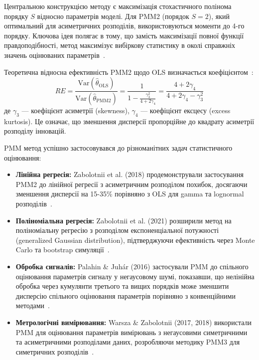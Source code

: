 \documentclass[12pt,a4paper]{article}
\begin{document}
Центральною конструкцією методу є максимізація стохастичного полінома порядку $S$ відносно параметрів моделі. Для PMM2 (порядок $S=2$), який оптимальний для асиметричних розподілів, використовуються моменти до 4-го порядку. Ключова ідея полягає в тому, що замість максимізації повної функції правдоподібності, метод максимізує вибіркову статистику в околі справжніх значень оцінюваних параметрів~\cite{kunchenko2002polynomial,kunchenko2006stochastic}.

Теоретична відносна ефективність PMM2 щодо OLS визначається коефіцієнтом~\cite{zabolotnii2018polynomial}:
\begin{equation}
\label{eq:relative_efficiency}
RE = \frac{\text{Var}(\hat{\theta}_{\text{OLS}})}{\text{Var}(\hat{\theta}_{\text{PMM2}})} = \frac{1}{1 - \frac{\gamma_3^2}{4+2\gamma_4}} = \frac{4 + 2\gamma_4}{4 + 2\gamma_4 - \gamma_3^2}
\end{equation}
де $\gamma_3$ --- коефіцієнт асиметрії (skewness), $\gamma_4$ --- коефіцієнт ексцесу (excess kurtosis). Це означає, що зменшення дисперсії пропорційне до квадрату асиметрії розподілу інновацій.

PMM метод успішно застосовувався до різноманітних задач статистичного оцінювання:

\begin{itemize}
    \item \textbf{Лінійна регресія:} Zabolotnii et al. (2018) продемонстрували застосування PMM2 до лінійної регресії з асиметричним розподілом похибок, досягаючи зменшення дисперсії на 15-35\% порівняно з OLS для gamma та lognormal розподілів~\cite{zabolotnii2018polynomial}.

    \item \textbf{Поліноміальна регресія:} Zabolotnii et al. (2021) розширили метод на поліноміальну регресію з розподілом експоненціальної потужності (generalized Gaussian distribution), підтверджуючи ефективність через Monte Carlo та bootstrap симуляції~\cite{zabolotnii2021estimating}.

    \item \textbf{Обробка сигналів:} Palahin \& Juhár (2016) застосували PMM до спільного оцінювання параметрів сигналу у негаусовому шумі, показавши, що нелінійна обробка через кумулянти третього та вищих порядків може зменшити дисперсію спільного оцінювання параметрів порівняно з конвенційними методами~\cite{palahin2016joint}.

    \item \textbf{Метрологічні вимірювання:} Warsza \& Zabolotnii (2017, 2018) використали PMM для оцінювання параметрів вимірювань з негаусовими симетричними та асиметричними розподілами даних, розробляючи методику PMM3 для симетричних розподілів~\cite{warsza2017polynomial,zabolotnii2020estimation}.
\end{itemize}
\end{document}
